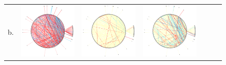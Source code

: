 \documentclass{bioinfo}
\begin{document}
\begin{figure}
\begin{tabular}{lcccccc}
  b.  &\includegraphics[scale=0.16]{results/mut/t1.png}
    &     \includegraphics[scale=0.16]{results/mut/t2.png}
    &     \includegraphics[scale=0.16]{results/mut/t3.png} 

\end{tabular}
\end{figure}
\end{document}
